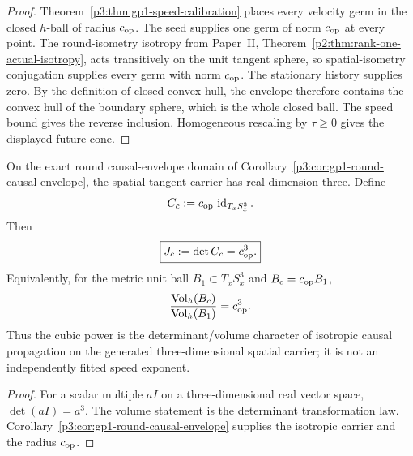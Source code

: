 \documentclass[12pt,a4paper]{article}
\begin{document}
\begin{proof}
Theorem~\ref{p3:thm:gp1-speed-calibration} places every velocity germ in the
closed \(h\)-ball of radius \(c_{\rm op}\).  The seed supplies one germ of
norm \(c_{\rm op}\) at every point.  The round-isometry isotropy from
Paper~II, Theorem~\ref{p2:thm:rank-one-actual-isotropy}, acts transitively on
the unit tangent sphere, so spatial-isometry conjugation supplies every germ
with norm \(c_{\rm op}\).  The stationary history supplies zero.  By the
definition of closed convex hull, the envelope therefore contains the convex
hull of the boundary sphere, which is the whole
closed ball.  The speed bound gives the reverse inclusion.  Homogeneous
rescaling by \(\tau\ge0\) gives the displayed future cone.
\end{proof}

\begin{corollary}
\label{p3a:cor:v177-three-dimensional-causal-determinant}
On the exact round causal-envelope domain of
Corollary~\ref{p3:cor:gp1-round-causal-envelope}, the spatial tangent carrier
has real dimension three.  Define
\[
 C_c:=c_{\rm op}\,\operatorname{id}_{T_xS_x^3}.
\]
Then
\begin{equation}
\label{p3a:eq:v177-three-dimensional-causal-determinant}
 \boxed{J_c:=\det C_c=c_{\rm op}^{3}.}
\end{equation}
Equivalently, for the metric unit ball \(B_1\subset T_xS_x^3\) and
\(B_c=c_{\rm op}B_1\),
\[
 \frac{\operatorname{Vol}_h(B_c)}{\operatorname{Vol}_h(B_1)}=c_{\rm op}^{3}.
\]
Thus the cubic power is the determinant/volume character of isotropic causal
propagation on the generated three-dimensional spatial carrier; it is not an
independently fitted speed exponent.
\end{corollary}
\begin{proof}
For a scalar multiple \(aI\) on a three-dimensional real vector space,
\(\det(aI)=a^3\).  The volume statement is the determinant transformation
law.  Corollary~\ref{p3:cor:gp1-round-causal-envelope} supplies the isotropic
carrier and the radius \(c_{\rm op}\).
\end{proof}
\end{document}
